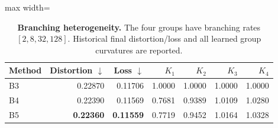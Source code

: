 \begin{table}[t]
\centering
\caption{\textbf{Branching heterogeneity.} The four groups have branching rates $[2,8,32,128]$. Historical final distortion/loss and all learned group curvatures are reported.}
\label{tab:heterogeneity}
\footnotesize\setlength{\tabcolsep}{4.2pt}\renewcommand{\arraystretch}{1.12}
\begin{adjustbox}{max width=\linewidth}
\begin{tabular}{lrrrrrr}
\toprule
Method & Distortion $\downarrow$ & Loss $\downarrow$ & $K_1$ & $K_2$ & $K_3$ & $K_4$ \\
\midrule
B3 & 0.22870 & 0.11706 & 1.0000 & 1.0000 & 1.0000 & 1.0000 \\
B4 & 0.22390 & 0.11569 & 0.7681 & 0.9389 & 1.0109 & 1.0280 \\
\rowcolor{oursbg}
B5 & \textbf{0.22360} & \textbf{0.11559} & 0.7719 & 0.9452 & 1.0164 & 1.0328 \\
\bottomrule
\end{tabular}
\end{adjustbox}
\end{table}
